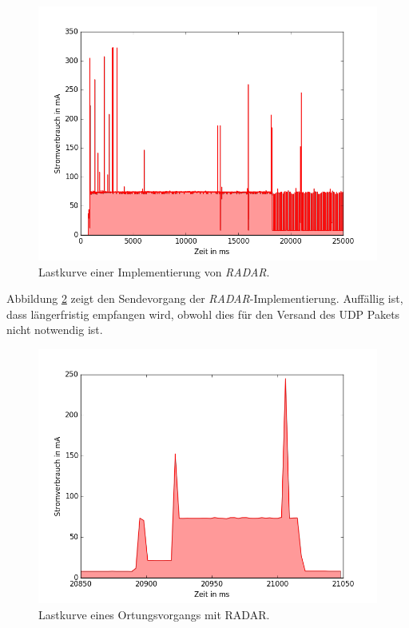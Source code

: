 \begin{figure}[h!]
  \centering
	\includegraphics[width=\textwidth]{plots/radar5s.png}
  \caption{Lastkurve einer Implementierung von \emph{RADAR}.}
  \label{fig:radar5s}
\end{figure}

Abbildung \ref{fig:radar5ssend} zeigt den Sendevorgang der \emph{RADAR}-Implementierung.
Auffällig ist, dass längerfristig empfangen wird, obwohl dies für den Versand des UDP Pakets nicht notwendig ist.\\

\begin{figure}[h!]
  \centering
	\includegraphics[width=\textwidth]{plots/radar5ssend.png}
  \caption{Lastkurve eines Ortungsvorgangs mit RADAR.}
  \label{fig:radar5ssend}
\end{figure}

